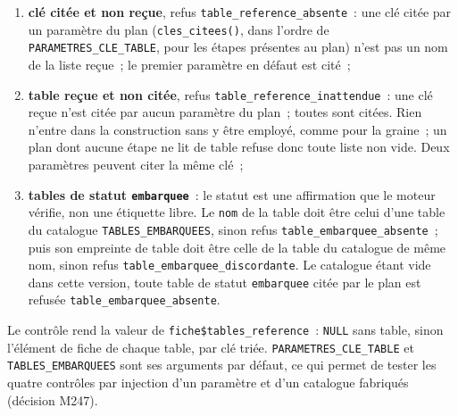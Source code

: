 \documentclass[a4paper,11pt]{article}
\newcommand{\code}[1]{\texttt{\small #1}}
\begin{document}
\begin{enumerate}[leftmargin=*, itemsep=2pt]
  \item \textbf{clé citée et non reçue}, refus
    \code{table\_reference\_absente}~: une clé citée par un paramètre du
    plan (\code{cles\_citees()}, dans l'ordre de
    \code{PARAMETRES\_CLE\_TABLE}, pour les étapes présentes au plan) n'est
    pas un nom de la liste reçue~; le premier paramètre en défaut est cité~;
  \item \textbf{table reçue et non citée}, refus
    \code{table\_reference\_inattendue}~: une clé reçue n'est citée par
    aucun paramètre du plan~; toutes sont citées. Rien n'entre dans la
    construction sans y être employé, comme pour la graine~; un plan dont
    aucune étape ne lit de table refuse donc toute liste non vide. Deux
    paramètres peuvent citer la même clé~;
  \item \textbf{tables de statut \code{embarquee}}~: le statut est une
    affirmation que le moteur vérifie, non une étiquette libre. Le
    \code{nom} de la table doit être celui d'une table du catalogue
    \code{TABLES\_EMBARQUEES}, sinon refus
    \code{table\_embarquee\_absente}~; puis son empreinte de table doit être
    celle de la table du catalogue de même nom, sinon refus
    \code{table\_embarquee\_discordante}. Le catalogue étant vide dans cette
    version, toute table de statut \code{embarquee} citée par le plan est
    refusée \code{table\_embarquee\_absente}.
\end{enumerate}
Le contrôle rend la valeur de \code{fiche\$tables\_reference}~: \code{NULL}
sans table, sinon l'élément de fiche de chaque table, par clé triée.
\code{PARAMETRES\_CLE\_TABLE} et \code{TABLES\_EMBARQUEES} sont ses
arguments par défaut, ce qui permet de tester les quatre contrôles par
injection d'un paramètre et d'un catalogue fabriqués (décision M247).
\end{document}
